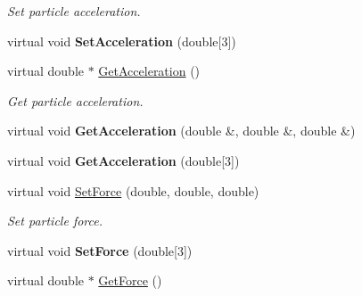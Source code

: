 \begin{DoxyCompactItemize}
\begin{DoxyCompactList}\small\item\em Set particle acceleration. \item\end{DoxyCompactList}\item 
\hypertarget{classvtkParticle_aede2649a29a79be1543f1c549ee0d59d}{
virtual void {\bfseries SetAcceleration} (double\mbox{[}3\mbox{]})}
\label{classvtkParticle_aede2649a29a79be1543f1c549ee0d59d}

\item 
\hypertarget{classvtkParticle_a3440374514bd93e61d2271f2e7a38066}{
virtual double $\ast$ \hyperlink{classvtkParticle_a3440374514bd93e61d2271f2e7a38066}{GetAcceleration} ()}
\label{classvtkParticle_a3440374514bd93e61d2271f2e7a38066}

\begin{DoxyCompactList}\small\item\em Get particle acceleration. \item\end{DoxyCompactList}\item 
\hypertarget{classvtkParticle_ad4c80e4bf142a671d428296f085d1014}{
virtual void {\bfseries GetAcceleration} (double \&, double \&, double \&)}
\label{classvtkParticle_ad4c80e4bf142a671d428296f085d1014}

\item 
\hypertarget{classvtkParticle_abadfb1924dada58843b2a67d79081a22}{
virtual void {\bfseries GetAcceleration} (double\mbox{[}3\mbox{]})}
\label{classvtkParticle_abadfb1924dada58843b2a67d79081a22}

\item 
\hypertarget{classvtkParticle_a9b3d5b6ddfc1ee4c1da1e5df31b9bcbd}{
virtual void \hyperlink{classvtkParticle_a9b3d5b6ddfc1ee4c1da1e5df31b9bcbd}{SetForce} (double, double, double)}
\label{classvtkParticle_a9b3d5b6ddfc1ee4c1da1e5df31b9bcbd}

\begin{DoxyCompactList}\small\item\em Set particle force. \item\end{DoxyCompactList}\item 
\hypertarget{classvtkParticle_acbce4e87652c0e735d4c9d304e8ab0eb}{
virtual void {\bfseries SetForce} (double\mbox{[}3\mbox{]})}
\label{classvtkParticle_acbce4e87652c0e735d4c9d304e8ab0eb}

\item 
\hypertarget{classvtkParticle_aed0be870bbd4168123311368f0ca94e4}{
virtual double $\ast$ \hyperlink{classvtkParticle_aed0be870bbd4168123311368f0ca94e4}{GetForce} ()}
\label{classvtkParticle_aed0be870bbd4168123311368f0ca94e4}


\end{DoxyCompactItemize}
